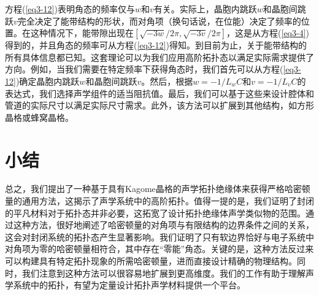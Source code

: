 方程(\ref{eq3-12})表明角态的频率仅与\(w\)和\(v\)有关。实际上，晶胞内跳跃\(w\)和晶胞间跳跃\(v\)完全决定了能带结构的形状，而对角项（换句话说，在位能）决定了频率的位置。在这种情况下，能带隙出现在\([\sqrt{-3w}/2\pi,\sqrt{-3v}/2\pi]\)，这是从方程(\ref{eq3-4})得到的，并且角态的频率可从方程(\ref{eq3-12})得知。到目前为止，关于能带结构的所有具体信息都已知。这套理论可以为我们应用高阶拓扑态以满足实际需求提供了方向。例如，当我们需要在特定频率下获得角态时，我们首先可以从方程(\ref{eq3-12})确定晶胞内跳跃\(w\)和晶胞间跳跃\(v\)。然后，根据\(w = -1/L_wC\)和\(v = -1/L_vC\)的表达式，我们选择声学组件的适当阻抗值。最后，我们可以基于这些来设计腔体和管道的实际尺寸以满足实际尺寸需求。此外，该方法可以扩展到其他结构，如方形晶格或蜂窝晶格。


\section{小结}
总之，我们提出了一种基于具有Kagome晶格的声学拓扑绝缘体来获得严格哈密顿量的通用方法，这揭示了声学系统中的高阶拓扑。值得一提的是，我们证明了封闭的平凡材料对于拓扑态并非必要，这拓宽了设计拓扑绝缘体声学类似物的范围。通过这种方法，很好地阐述了哈密顿量的对角项与有限结构的边界条件之间的关系，这会对封闭系统的拓扑态产生显著影响。我们证明了只有软边界恰好与电子系统中对角项为零的哈密顿量相符合，其中存在“零能”角态。关键的是，这种方法反过来可以构建具有特定拓扑现象的所需哈密顿量，进而直接设计精确的物理结构。同时，我们注意到这种方法可以很容易地扩展到更高维度。我们的工作有助于理解声学系统中的拓扑，有望为定量设计拓扑声学材料提供一个平台。